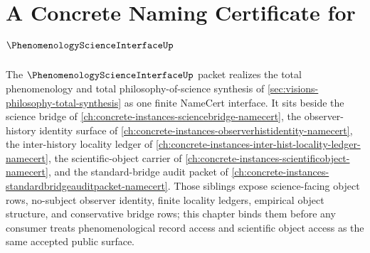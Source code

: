 \chapter{A Concrete Naming Certificate for $\PhenomenologyScienceInterfaceUp$}
\label{ch:concrete-instances-phenomenology-science-interface-namecert}

The $\PhenomenologyScienceInterfaceUp$ packet realizes the total phenomenology and total philosophy-of-science synthesis of \autoref{sec:visions-philosophy-total-synthesis} as one finite NameCert interface. It sits beside the science bridge of \autoref{ch:concrete-instances-sciencebridge-namecert}, the observer-history identity surface of \autoref{ch:concrete-instances-observerhistidentity-namecert}, the inter-history locality ledger of \autoref{ch:concrete-instances-inter-hist-locality-ledger-namecert}, the scientific-object carrier of \autoref{ch:concrete-instances-scientificobject-namecert}, and the standard-bridge audit packet of \autoref{ch:concrete-instances-standardbridgeauditpacket-namecert}. Those siblings expose science-facing object rows, no-subject observer identity, finite locality ledgers, empirical object structure, and conservative bridge rows; this chapter binds them before any consumer treats phenomenological record access and scientific object access as the same accepted public surface.

